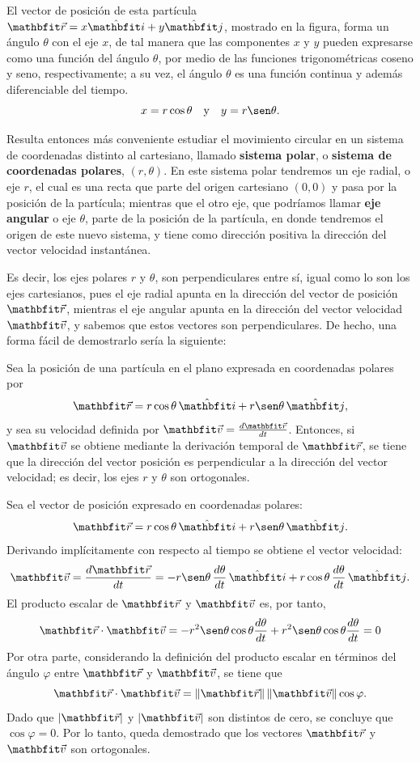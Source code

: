 El vector de posición de esta partícula $\vecr = x\veci+ y\vecj$, mostrado en la figura, forma un ángulo $\theta$ con el eje $x$, de tal manera que las componentes $x$ y $y$ pueden expresarse como una función del ángulo $\theta$, por medio de las funciones trigonométricas coseno y seno, respectivamente; a su vez, el ángulo $\theta$ es una función continua y además diferenciable del tiempo.
$$x = r\cos\theta \quad \text{y} \quad y = r\sen\theta.$$

Resulta entonces más conveniente estudiar el movimiento circular en un sistema de coordenadas distinto al cartesiano, llamado \textbf{sistema polar}, o \textbf{sistema de coordenadas polares}, $(r, \theta)$. En este sistema polar tendremos un eje radial, o eje $r$, el cual es una recta que parte del origen cartesiano $(0,0)$ y pasa por la posición de la partícula; mientras que el otro eje, que podríamos llamar \textbf{eje angular} o eje $\theta$, parte de la posición de la partícula, en donde tendremos el origen de este nuevo sistema, y tiene como dirección positiva la dirección del vector velocidad instantánea.

Es decir, los ejes polares $r$ y $\theta$, son perpendiculares entre sí, igual como lo son los ejes cartesianos, pues el eje radial apunta en la dirección del vector de posición $\vecr$, mientras el eje angular apunta en la dirección del vector velocidad $\veloi$, y sabemos que estos vectores son perpendiculares. De hecho, una forma fácil de demostrarlo sería la siguiente:
\begin{proposition}{}{}
    Sea la posición de una partícula en el plano expresada en coordenadas polares por
    $$\vecr = r\cos\theta\,\veci + r\sen\theta\,\vecj,$$
    y sea su velocidad definida por $\veloi = \frac{d\vecr}{dt}$. Entonces, si $\veloi$ se obtiene mediante la derivación temporal de $\vecr$, se tiene que la dirección del vector posición es perpendicular a la dirección del vector velocidad; es decir, los ejes $r$ y $\theta$ son ortogonales.
    \vspace{2mm}
    \begin{demo}
        Sea el vector de posición expresado en coordenadas polares:
        $$\vecr = r\cos\theta\,\veci + r\sen\theta\,\vecj.$$
        Derivando implícitamente con respecto al tiempo se obtiene el vector velocidad:
        $$\veloi = \frac{d\vecr}{dt} = -r\sen\theta\,\frac{d\theta}{dt}\,\veci + r\cos\theta\,\frac{d\theta}{dt}\,\vecj.$$
        El producto escalar de $\vecr$ y $\veloi$ es, por tanto,
        $$\vecr \cdot \veloi = -r^2\sen\theta\cos\theta\frac{d\theta}{dt} + r^2\sen\theta\cos\theta\frac{d\theta}{dt} = 0$$
        Por otra parte, considerando la definición del producto escalar en términos del ángulo $\varphi$ entre $\vecr$ y $\veloi$, se tiene que
        $$\vecr\cdot\veloi = \|\vecr\|\,\|\veloi\|\cos\varphi.$$
        Dado que $|\vecr|$ y $|\veloi|$ son distintos de cero, se concluye que $\cos\varphi=0$. Por lo tanto, queda demostrado que los vectores $\vecr$ y $\veloi$ son ortogonales.
    \end{demo}
\end{proposition}

